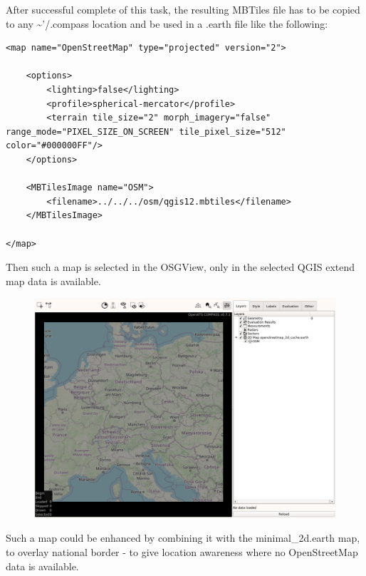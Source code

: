 After successful complete of this task, the resulting MBTiles file has to be copied to any \textasciitilde'/.compass location and be used in a .earth file like the following:

\begin{lstlisting}
<map name="OpenStreetMap" type="projected" version="2">

    <options>
        <lighting>false</lighting>
        <profile>spherical-mercator</profile>
        <terrain tile_size="2" morph_imagery="false" range_mode="PIXEL_SIZE_ON_SCREEN" tile_pixel_size="512" color="#000000FF"/>
    </options>
    
    <MBTilesImage name="OSM">
        <filename>../../../osm/qgis12.mbtiles</filename>
    </MBTilesImage>
    
</map>
\end{lstlisting}

Then such a map is selected in the OSGView, only in the selected QGIS extend map data is available.

\begin{figure}[H]
    \hspace*{-2.5cm}
    \includegraphics[width=19cm,frame]{figures/osgview_qgis_osm1.png}
\end{figure}

Such a map could be enhanced by combining it with the minimal\_2d.earth map, to overlay national border - to give location awareness where no OpenStreetMap data is available.

